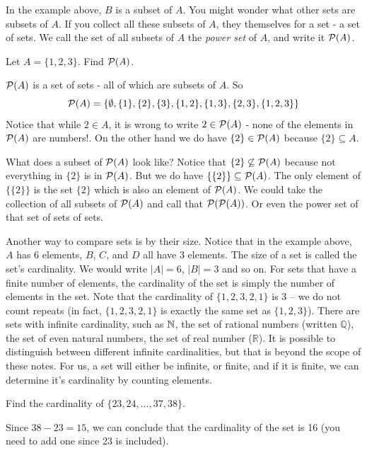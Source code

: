 \documentclass[12pt]{article}
\begin{document}
In the example above, $B$ is a subset of $A$.  You might wonder what other sets are subsets of $A$.  If you collect all these subsets of $A$, they themselves for a set - a set of sets.  We call the set of all subsets of $A$ the {\em power set} of $A$, and write it $\mathcal P(A)$.  

\begin{example}
  Let $A = \{1,2,3\}$.  Find $\mathcal P(A)$.
  \begin{solution}
    $\mathcal P(A)$ is a set of sets - all of which are subsets of $A$.  So
    \[\mathcal P(A) = \{ \emptyset, \{1\}, \{2\}, \{3\}, \{1,2\}, \{1, 3\}, \{2,3\}, \{1,2,3\}\}\]
    Notice that while $2 \in A$, it is wrong to write $2 \in \mathcal P(A)$ - none of the elements in $\mathcal P(A)$ are numbers!.  On the other hand we do have $\{2\} \in \mathcal P(A)$ because $\{2\} \subseteq A$.  
    
    What does a subset of $\mathcal P(A)$ look like?  Notice that $\{2\} \not\subseteq \mathcal P(A)$ because not everything in $\{2\}$ is in $\mathcal P(A)$.  But we do have $\{ \{2\} \} \subseteq \mathcal P(A)$.  The only element of $\{\{2\}\}$ is the set $\{2\}$ which is also an element of $\mathcal P(A)$.  We could take the collection of all subsets of $\mathcal P(A)$ and call that $\mathcal P(\mathcal P(A))$.  Or even the power set of that set of sets of sets. 
  \end{solution}

\end{example}


Another way to compare sets is by their size.  Notice that in the example above, $A$ has 6 elements, $B$, $C$, and $D$ all have 3 elements.  The size of a set is called the set's cardinality.  We would write $|A| = 6$, $|B| = 3$ and so on.  For sets that have a finite number of elements, the cardinality of the set is simply the number of elements in the set.  Note that the cardinality of $\{ 1, 2, 3, 2, 1\}$ is 3 -- we do not count repeats (in fact, $\{1, 2, 3, 2, 1\}$ is exactly the same set as $\{1, 2, 3\}$).  There are sets with infinite cardinality, such as $\mathbb N$, the set of rational numbers (written $\mathbb Q$), the set of even natural numbers, the set of real number ($\mathbb R$).  It is possible to distinguish between different infinite cardinalities, but that is beyond the scope of these notes.  For us, a set will either be infinite, or finite, and if it is finite, we can determine it's cardinality by counting elements.

\begin{example}
 Find the cardinality of $\{23, 24, \ldots, 37, 38\}$.  
\begin{solution}
 Since $38 - 23 = 15$, we can conclude that the cardinality of the set is 16 (you need to add one since 23 is included).
\end{solution}
\end{example}
\end{document}
